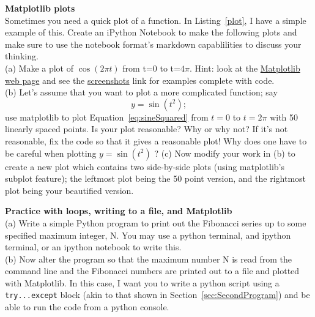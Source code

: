 \begin{prob}
\label{prob:matplotlib}
\textbf{\large Matplotlib plots}\\
Sometimes you need a quick plot of a function. In Listing~\ref{plot}, I have a simple example of this. Create an iPython Notebook to make the following plots and make sure to use the notebook format's markdown capablilities to discuss your thinking.  \\
(a) Make a plot of $\cos(2\pi t)$ from t=0 to t=$4\pi$. Hint: look at the \href{http://matplotlib.sourceforge.net/}{Matplotlib web page} and see the \href{http://matplotlib.sourceforge.net/screenshots.html}{screenshots} link for examples complete with code.\\
(b) Let's assume that you want to plot a more complicated function; say 
\begin{equation} y = \sin(t^2) ; \label{eq:sineSquared}\end{equation}
 use matplotlib to plot Equation~\ref{eq:sineSquared} from $t=0$ to $t=2\pi$ with 50 linearly spaced points.  Is your plot reasonable? Why or why not? If it's not reasonable, fix the code so that it gives a reasonable plot! Why does one have to be careful  when plotting $ y = \sin(t^2) $ ?
 (c) Now modify your work in (b) to create a new plot which contains two side-by-side plots (using matplotlib's subplot feature); the leftmost plot being the 50 point version, and the rightmost plot being your beautified version.
\end{prob}


\begin{prob}
\label{prob:fibonacci}
\textbf{\large Practice with loops, writing to a file, and Matplotlib}\\
(a) Write a simple Python program to print out the Fibonacci series up to some specified maximum integer, N. You may use a python terminal, and ipython terminal, or an ipython notebook to write this.\\
(b) Now alter the program so that the maximum number N is read from the command line and the Fibonacci numbers are printed out to a file and plotted with Matplotlib. In this case, I want you to write a python script using a \verb!try...except! block (akin to that shown in Section~\ref{sec:SecondProgram}) and be able to run the code from a python console. 

\end{prob}

